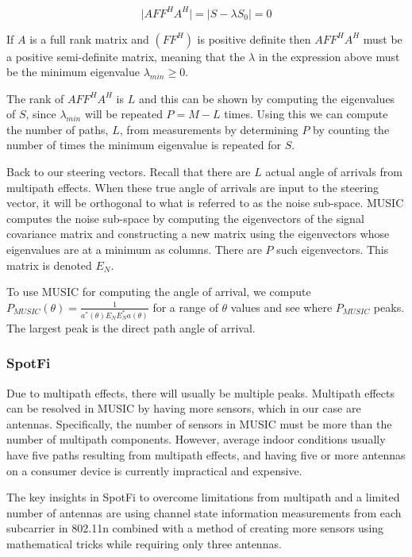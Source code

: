 \documentclass[12pt]{report}
\begin{document}
$$\lvert A FF^{H} A^{H} \rvert = \lvert S - \lambda S_{0} \rvert = 0$$

If $A$ is a full rank matrix and $(FF^{H})$ is positive definite then $A FF^{H} A^{H}$ must be a positive semi-definite matrix, meaning that the $\lambda$ in the expression above must be the minimum eigenvalue $\lambda_{min} \geq 0$. \par

The rank of $A FF^{H} A^{H}$ is $L$ and this can be shown by computing the eigenvalues of $S$, since $\lambda_{min}$ will be repeated $P = M - L$ times. Using this we can compute the number of paths, $L$, from measurements by determining $P$ by counting the number of times the minimum eigenvalue is repeated for $S$. \par

Back to our steering vectors. Recall that there are $L$ actual angle of arrivals from multipath effects. When these true angle of arrivals are input to the steering vector, it will be orthogonal to what is referred to as the noise sub-space. MUSIC computes the noise sub-space by computing the eigenvectors of the signal covariance matrix and constructing a new matrix using the eigenvectors whose eigenvalues are at a minimum as columns. There are $P$ such eigenvectors. This matrix is denoted $E_{N}$. \par

To use MUSIC for computing the angle of arrival, we compute $P_{MUSIC}(\theta) = \frac{1}{a^{*}(\theta) E_{N} E_{N}^{*} a(\theta)}$ for a range of $\theta$ values and see where $P_{MUSIC}$ peaks. The largest peak is the direct path angle of arrival. \par

\subsubsection{SpotFi}
Due to multipath effects, there will usually be multiple peaks. Multipath effects can be resolved in MUSIC by having more sensors, which in our case are antennas. Specifically, the number of sensors in MUSIC must be more than the number of multipath components. However, average indoor conditions usually have five paths resulting from multipath effects, and having five or more antennas on a consumer device is currently impractical and expensive. \par

The key insights in SpotFi to overcome limitations from multipath and a limited number of antennas are using channel state information measurements from each subcarrier in 802.11n combined with a method of creating more sensors using mathematical tricks while requiring only three antennas. \par
\end{document}
